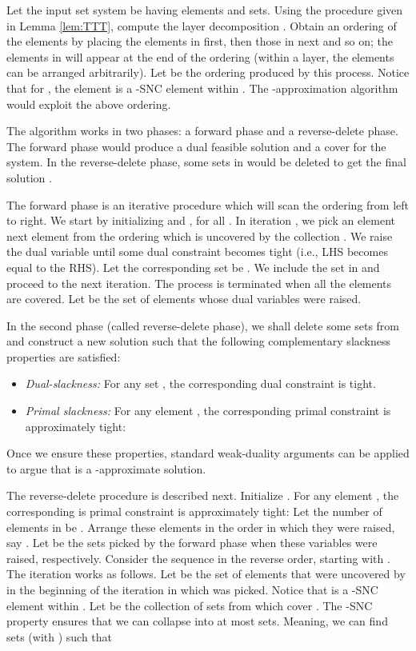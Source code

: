\documentclass[11pt]{article}
\begin{document}
Let the input set system be  having  elements and  sets.
Using the procedure given in Lemma \ref{lem:TTT}, compute the layer decomposition .
Obtain an ordering  of the elements by placing the elements in  first,
then those in  next and so on; the elements in  will appear at the end of the ordering
(within a layer, the elements can be arranged arbitrarily).
Let  be the ordering produced by this process.
Notice that for , the element  is a -SNC element within .
The -approximation algorithm would exploit the above ordering.

The algorithm works in two phases: a forward phase and a reverse-delete phase.
The forward phase would produce a dual feasible solution  and a cover  for the system.
In the reverse-delete phase, some sets in  would be deleted to get the final solution .

The forward phase is an iterative procedure which will scan the ordering  from left to right. 
We start by initializing 
and , for all . 
In iteration , we pick an element next element  from the ordering 
which is uncovered by the collection . We raise the dual variable  until
some dual constraint becomes tight (i.e., LHS becomes equal to the RHS). 
Let the corresponding set be . We include the set  in  and proceed to the next iteration.
The process is terminated when all the elements are covered. 
Let  be the set of elements whose dual variables were raised.

In the second phase (called reverse-delete phase), 
we shall delete some sets from  and construct a new solution  such that the following 
complementary slackness properties are satisfied:
\begin{itemize}
\item 
{\em Dual-slackness:} For any set , the corresponding dual constraint is tight.
\item 
{\em Primal slackness:} For any element , the corresponding primal constraint is approximately tight:

\end{itemize}
Once we ensure these properties, standard weak-duality arguments can be applied
to argue that  is a -approximate solution.

The reverse-delete procedure is described next.
Initialize .
For any element , the corresponding is primal constraint is approximately tight:
Let the number of elements in  be . Arrange these elements
in the order in which they were raised, say .
Let  be the sets picked by the forward phase
when these variables were raised, respectively.
Consider the sequence  in the reverse order, starting with .
The iteration  works as follows. 
Let  be the set of elements that were uncovered by  in the beginning of the iteration 
in which  was picked. Notice that  is a -SNC element within .
Let  be the collection of sets from  which cover . 
The -SNC property ensures that we can collapse  into at most  sets.
Meaning, we can find sets  (with ) such that
\end{document}
